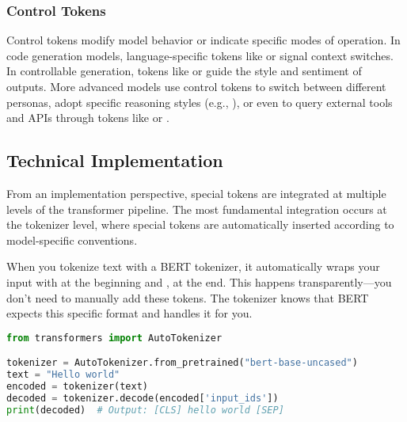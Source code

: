 \subsubsection{Control Tokens}
Control tokens modify model behavior or indicate specific modes of operation. In code generation models, language-specific tokens like  or  signal context switches. In controllable generation, tokens like  or  guide the style and sentiment of outputs. More advanced models use control tokens to switch between different personas, adopt specific reasoning styles (e.g., ), or even to query external tools and APIs through tokens like  or .
\begin{comment}
Feedback: The "Control Tokens" section is a great place to highlight the power and flexibility of special tokens. The examples are good. You could make this even more impactful by mentioning a more advanced or surprising example, if one exists. For instance, "More advanced models use control tokens to switch between different personas, adopt a specific reasoning style (e.g., chain-of-thought), or even to query external tools and APIs." This hints at the cutting-edge applications.

STATUS: addressed - added advanced examples including persona switching, reasoning styles, and tool querying capabilities
\end{comment}

\subsection{Technical Implementation}

From an implementation perspective, special tokens are integrated at multiple levels of the transformer pipeline. The most fundamental integration occurs at the tokenizer level, where special tokens are automatically inserted according to model-specific conventions.

When you tokenize text with a BERT tokenizer, it automatically wraps your input with \cls{} at the beginning and \sep{} at the end. This happens transparently—you don't need to manually add these tokens. The tokenizer knows that BERT expects this specific format and handles it for you.

\begin{lstlisting}[language=Python, caption={Automatic special token insertion}]
from transformers import AutoTokenizer

tokenizer = AutoTokenizer.from_pretrained("bert-base-uncased")
text = "Hello world"
encoded = tokenizer(text)
decoded = tokenizer.decode(encoded['input_ids'])
print(decoded)  # Output: [CLS] hello world [SEP]
\end{lstlisting}

